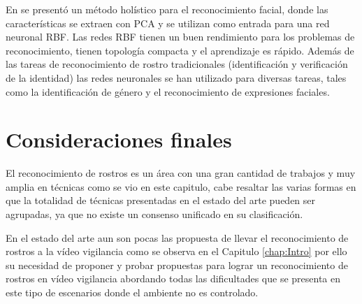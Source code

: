 En \cite{er2002face} se  presentó un método holístico para el reconocimiento facial, donde las características se extraen con \ac{PCA} y se utilizan como entrada para una red neuronal \ac{RBF}. Las redes \ac{RBF} tienen un buen rendimiento para los problemas de reconocimiento, tienen topología compacta y el aprendizaje es rápido. Además de las tareas de reconocimiento de rostro tradicionales  (identificación y verificación de la identidad) las redes neuronales se han utilizado para diversas tareas, tales como la identificación de género y el reconocimiento de expresiones faciales. 

\section{Consideraciones finales}
El reconocimiento de rostros es un área con una gran cantidad de trabajos y muy amplia en técnicas como se vio en este capitulo, cabe resaltar las varias formas en que la totalidad de técnicas presentadas en el estado del arte pueden ser agrupadas, ya que no existe un consenso unificado en su clasificación.

En el estado del arte aun son pocas las propuesta de llevar el reconocimiento de rostros a la vídeo vigilancia como se observa en el Capitulo \ref{chap:Intro} por ello su necesidad de proponer y probar propuestas para lograr un reconocimiento de rostros en vídeo vigilancia abordando todas las dificultades que se presenta en este tipo de escenarios donde el ambiente no es controlado.

